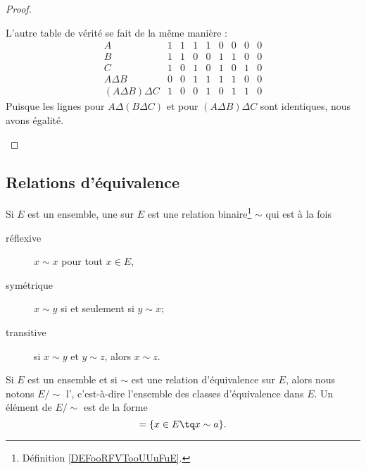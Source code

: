 \begin{proof}
\begin{subproof}
		L'autre table de vérité se fait de la même manière :
		\begin{equation}
			\begin{array}{|c|c|c|c|c|c|c|c|c|}
				A                   & 1 & 1 & 1 & 1 & 0 & 0 & 0 & 0 \\
				B                   & 1 & 1 & 0 & 0 & 1 & 1 & 0 & 0 \\
				C                   & 1 & 0 & 1 & 0 & 1 & 0 & 1 & 0 \\
				\hline%
				A\Delta B           & 0 & 0 & 1 & 1 & 1 & 1 & 0 & 0 \\
				\hline%
				(A\Delta B)\Delta C & 1 & 0 & 0 & 1 & 0 & 1 & 1 & 0
			\end{array}
		\end{equation}
		Puisque les lignes pour \( A\Delta (B\Delta C)\) et pour \( (A\Delta B)\Delta C\) sont identiques, nous avons égalité.
	\end{subproof}
\end{proof}

\subsection{Relations d'équivalence}
\label{appEquivalence}

\begin{definition}  \label{DefHoJzMp}
	Si \( E\) est un ensemble, une  sur \( E\) est une relation binaire\footnote{Définition \ref{DEFooRFVTooUUuFuE}.} \( \sim\) qui est à la fois
	\begin{description}
		\item[réflexive]  \( x\sim x\) pour tout \( x\in E\),
		\item[symétrique] \( x\sim y\) si et seulement si \( y\sim x\);
		\item[transitive] si \( x\sim y\) et \( y\sim z\), alors \( x\sim z\).
	\end{description}
\end{definition}

\begin{definition}      \label{DEFooRHPSooHKBZXl}
	Si \( E\) est un ensemble et si \( \sim\) est une relation d'équivalence sur \( E\), alors nous notons \( E/\sim\) l', c'est-à-dire l'ensemble des classes d'équivalence dans \( E\). Un élément de \( E/\sim\) est de la forme
	\begin{equation}
		[a]=\{ x\in E\tq x\sim a \}.
	\end{equation}
\end{definition}

